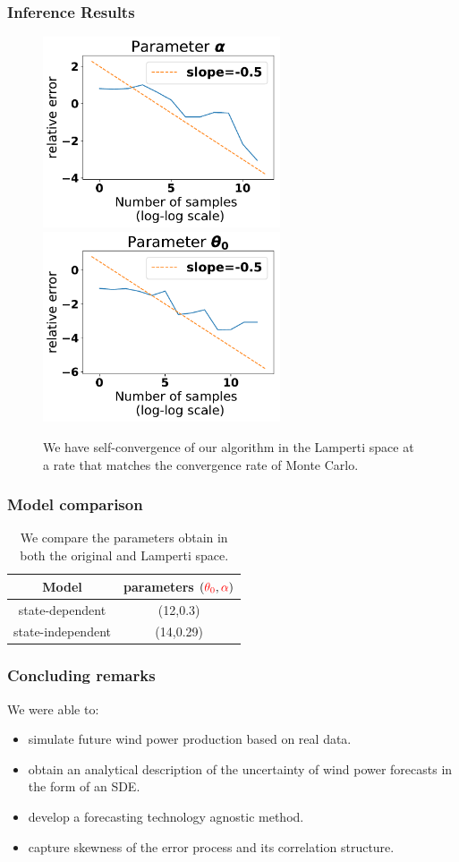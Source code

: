\documentclass[aspectratio=169]{beamer}\usepackage[utf8]{inputenc}
\begin{document}
\begin{frame}\frametitle{Inference Results}
\begin{figure}
  \includegraphics[width=70mm,scale=1]{plots/alpha_conv_beta.pdf}
  \includegraphics[width=70mm,scale=1]{plots/theta_conv_beta.pdf}
    \caption{We have self-convergence of our algorithm in the Lamperti space at a rate that matches the convergence rate of Monte Carlo.}
\end{figure}
\end{frame}


\begin{frame}\frametitle{Model comparison}
\begin{table}[]
\centering
\begin{tabular}{|c|c|}
\hline
Model   &  parameters $(\textcolor{red}{\theta_0}, \textcolor{red}{\alpha})$    \\ \hline
state-dependent &   (12,0.3)    \\ \hline
state-independent &   (14,0.29)     \\ \hline
\end{tabular}
\caption{We compare the parameters obtain in both the original and Lamperti space. }
\label{tab:model_comparison}
\end{table}
\end{frame}

\begin{frame}\frametitle{Concluding remarks}
We were able to:
\begin{itemize}
  \item simulate future wind power production based on real data.
  \item obtain an analytical description of the uncertainty of wind power forecasts in the form of an SDE.
  \item develop a forecasting technology agnostic method.
  \item capture skewness of the error process and its correlation structure.
\end{itemize}
\end{frame}
\end{document}
